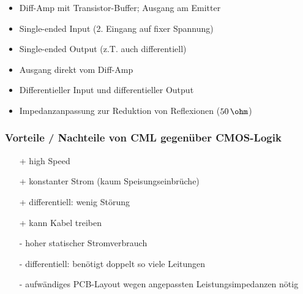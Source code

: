 \begin{minipage}[t]{0.55\columnwidth}
    \begin{center}
    \end{center}

    \begin{itemize}
        \item Diff-Amp mit Transistor-Buffer; Ausgang am Emitter 
        \item Single-ended Input (2. Eingang auf fixer Spannung)
        \item Single-ended Output (z.T. auch differentiell)
    \end{itemize}
\end{minipage}
\hfill
\begin{minipage}[t]{0.43\columnwidth}
    \begin{center}
    \end{center}

    \begin{itemize}
        \item Ausgang direkt vom Diff-Amp
        \item Differentieller Input und differentieller Output
        \item Impedanzanpassung zur Reduktion von Reflexionen ($50 \, \ohm$)
    \end{itemize}
\end{minipage}


\subsubsection{Vorteile / Nachteile von CML gegenüber CMOS-Logik}

\begin{minipage}[t]{0.48\columnwidth}
    \raggedcolumns
    \begin{itemize}
        \item[+] high Speed
        \item[+] konstanter Strom (kaum Speisungseinbrüche)
        \item[+] differentiell: wenig Störung
        \item[+] kann Kabel treiben 
    \end{itemize}
\end{minipage}
\hfill
\begin{minipage}[t]{0.48\columnwidth}
    \raggedcolumns
    \begin{itemize}
        \item[-] hoher statischer Stromverbrauch
        \item[-] differentiell: benötigt doppelt so viele Leitungen
        \item[-] aufwändiges PCB-Layout wegen angepassten Leistungsimpedanzen nötig 
    \end{itemize}
\end{minipage}

